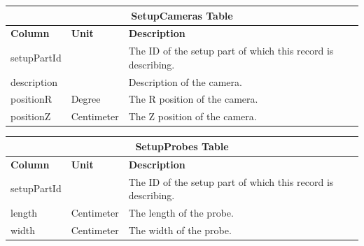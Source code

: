 \begin{table}[h!]
\centering
\begin{tabular}{l l p{10.3cm}}
\multicolumn{3}{c}{\bf SetupCameras Table} \\ \hline
{\bf Column} & {\bf Unit} & {\bf Description}\\ \hline
setupPartId & & The ID of the setup part of which this record is describing.\\ \hline
description & & Description of the camera.\\ \hline
positionR & Degree & The R position of the camera.\\ \hline
positionZ & Centimeter & The Z position of the camera.\\ \hline
\end{tabular}
\end{table}

\begin{table}[h!]
\centering
\begin{tabular}{l l p{10.3cm}}
\multicolumn{3}{c}{\bf SetupProbes Table} \\ \hline
{\bf Column} & {\bf Unit} & {\bf Description}\\ \hline
setupPartId & & The ID of the setup part of which this record is describing.\\ \hline
length & Centimeter & The length of the probe.\\ \hline
width & Centimeter & The width of the probe.\\ \hline
\end{tabular}
\end{table}

